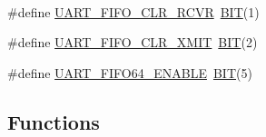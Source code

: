\begin{DoxyCompactItemize}
$$\item 
\#define \mbox{\hyperlink{group__uart_ga4f43b659076a9567d99e390ffb3729a6}{U\+A\+R\+T\+\_\+\+F\+I\+F\+O\+\_\+\+C\+L\+R\+\_\+\+R\+C\+VR}}~\mbox{\hyperlink{group__uart_ga3a8ea58898cb58fc96013383d39f482c}{B\+IT}}(1)
\item 
\#define \mbox{\hyperlink{group__uart_ga5cd2d76d4d89dd4954700fe670590aaa}{U\+A\+R\+T\+\_\+\+F\+I\+F\+O\+\_\+\+C\+L\+R\+\_\+\+X\+M\+IT}}~\mbox{\hyperlink{group__uart_ga3a8ea58898cb58fc96013383d39f482c}{B\+IT}}(2)
\item 
\#define \mbox{\hyperlink{group__uart_gac086a0b3c496b9f90da78f1a04c71724}{U\+A\+R\+T\+\_\+\+F\+I\+F\+O64\+\_\+\+E\+N\+A\+B\+LE}}~\mbox{\hyperlink{group__uart_ga3a8ea58898cb58fc96013383d39f482c}{B\+IT}}(5)
\end{DoxyCompactItemize}
\subsection*{Functions}
